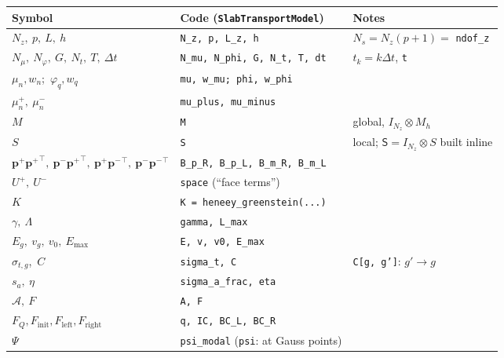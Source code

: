\documentclass[11pt,a4paper]{article}
\numberwithin{equation}{section}
\theoremstyle{remark}
\newcommand{\kron}{\otimes}
\newcommand{\Lmax}{\Lambda}
\newcommand{\pp}{{\bm{p}^{+}}}
\newcommand{\pmn}{{\bm{p}^{-}}}
\begin{document}
\begin{center}\small
\renewcommand{\arraystretch}{1.2}
\begin{tabular}{@{}lll@{}}
\toprule
Symbol & Code (\texttt{SlabTransportModel}) & Notes \\
\midrule
$N_z,\ p,\ L,\ h$ & \texttt{N\_z, p, L\_z, h} & $N_s=N_z(p+1)=$ \texttt{ndof\_z} \\
$N_\mu,\ N_\varphi,\ G,\ N_t,\ T,\ \Delta t$ & \texttt{N\_mu, N\_phi, G, N\_t, T, dt} & $t_k=k\Delta t$, \texttt{t} \\
$\mu_n,w_n$;\ $\varphi_q,w_q$ & \texttt{mu, w\_mu; phi, w\_phi} & \\
$\mu_n^{+},\ \mu_n^{-}$ & \texttt{mu\_plus, mu\_minus} & \\
$M$ & \texttt{M} & global, $I_{N_z}\kron M_h$ \\
$S$ & \texttt{S} & local; $\mathsf S=I_{N_z}\kron S$ built inline \\
$\pp\pp^{\!\top},\ \pmn\pp^{\!\top},\ \pp\pmn^{\!\top},\ \pmn\pmn^{\!\top}$ & \texttt{B\_p\_R, B\_p\_L, B\_m\_R, B\_m\_L} & \\
$U^{+},\ U^{-}$ & \texttt{space} (``face terms'') & \\
$K$ & \texttt{K = heneey\_greenstein(...)} & \\
$\gamma,\ \Lmax$ & \texttt{gamma, L\_max} & \\
$E_g,\ v_g,\ v_0,\ E_{\max}$ & \texttt{E, v, v0, E\_max} & \\
$\sigma_{t,g}$,\ $C$ & \texttt{sigma\_t, C} & \texttt{C[g, g']}: $g'\to g$ \\
$s_a,\ \eta$ & \texttt{sigma\_a\_frac, eta} & \\
$\mathcal{A},\ F$ & \texttt{A, F} & \\
$F_Q,F_{\mathrm{init}},F_{\mathrm{left}},F_{\mathrm{right}}$ & \texttt{q, IC, BC\_L, BC\_R} & \\
$\Psi$ & \texttt{psi\_modal} (\texttt{psi}: at Gauss points) & \\
\bottomrule
\end{tabular}
\end{center}



\end{document}
